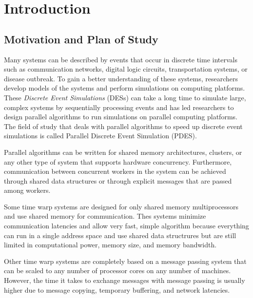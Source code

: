 \documentclass[11pt]{book}
\begin{document}
\tableofcontents \markright{ }
\listoffigures \markright{ }
\listofalgorithms \markright { }
\lstlistoflistings \markright{ }

\clearpage
{} \setcounter{page}{1}

\chapter{Introduction}\label{intro}

\section{Motivation and Plan of Study}

Many systems can be described by events that occur in discrete time intervals such as
communication networks, digital logic circuits, transportation systems, or disease
outbreak. To gain a better understanding of these systems, researchers develop models of
the systems and perform simulations on computing platforms. These \emph{Discrete Event
Simulations} (DESs) can take a long time to simulate large, complex systems by sequentially
processing events and has led researchers to design parallel algorithms to run simulations
on parallel computing platforms. The field of study that deals with parallel algorithms
to speed up discrete event simulations is called Parallel Discrete Event Simulation (PDES).

Parallel algorithms can be written for shared memory architectures, clusters, or any other
type of system that supports hardware concurrency. Furthermore, communication between
concurrent workers in the system can be achieved through shared data structures or through
explicit messages that are passed among workers.

Some time warp systems are designed for only shared memory multiprocessors and use shared
memory for communication. Thes systems minimize communication latencies and allow very fast,
simple algorithm because everything can run in a single address space and use shared data
structrures but are still limited in computational power, memory size, and memory bandwidth.

Other time warp systems are completely based on a message passing system that can be scaled
to any number of processor cores on any number of machines. However, the time it takes to
exchange messages with message passing is usually higher due to message copying, temporary
buffering, and network latencies.
\end{document}
